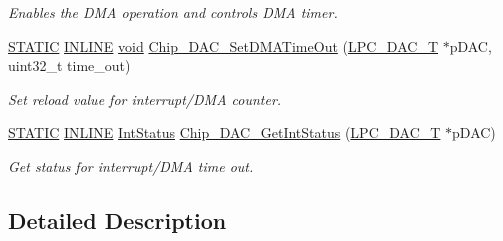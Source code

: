 \begin{DoxyCompactItemize}
\begin{DoxyCompactList}\small\item\em Enables the D\-M\-A operation and controls D\-M\-A timer. \end{DoxyCompactList}\item 
\hyperlink{group__LPC__Types__Public__Macros_ga10b2d890d871e1489bb02b7e70d9bdfb}{S\-T\-A\-T\-I\-C} \hyperlink{group__LPC__Types__Public__Types_ga2eb6f9e0395b47b8d5e3eeae4fe0c116}{I\-N\-L\-I\-N\-E} \hyperlink{Paradigm_2Tern__EE_2small_2portmacro_8h_a14d32f8130d3c0b212cfc751730b5b49}{void} \hyperlink{group__DAC__17XX__40XX_ga25d6e27e6b906dc2062257175697b438}{Chip\-\_\-\-D\-A\-C\-\_\-\-Set\-D\-M\-A\-Time\-Out} (\hyperlink{structLPC__DAC__T}{L\-P\-C\-\_\-\-D\-A\-C\-\_\-\-T} $\ast$p\-D\-A\-C, uint32\-\_\-t time\-\_\-out)
\begin{DoxyCompactList}\small\item\em Set reload value for interrupt/\-D\-M\-A counter. \end{DoxyCompactList}\item 
\hyperlink{group__LPC__Types__Public__Macros_ga10b2d890d871e1489bb02b7e70d9bdfb}{S\-T\-A\-T\-I\-C} \hyperlink{group__LPC__Types__Public__Types_ga2eb6f9e0395b47b8d5e3eeae4fe0c116}{I\-N\-L\-I\-N\-E} \hyperlink{group__LPC__Types__Public__Types_gab7d263072f745b4f3913fb0afc434c4e}{Int\-Status} \hyperlink{group__DAC__17XX__40XX_ga22cbef1d579da4780f4fb330107eb7cb}{Chip\-\_\-\-D\-A\-C\-\_\-\-Get\-Int\-Status} (\hyperlink{structLPC__DAC__T}{L\-P\-C\-\_\-\-D\-A\-C\-\_\-\-T} $\ast$p\-D\-A\-C)
\begin{DoxyCompactList}\small\item\em Get status for interrupt/\-D\-M\-A time out. \end{DoxyCompactList}\end{DoxyCompactItemize}


\subsection{Detailed Description}


